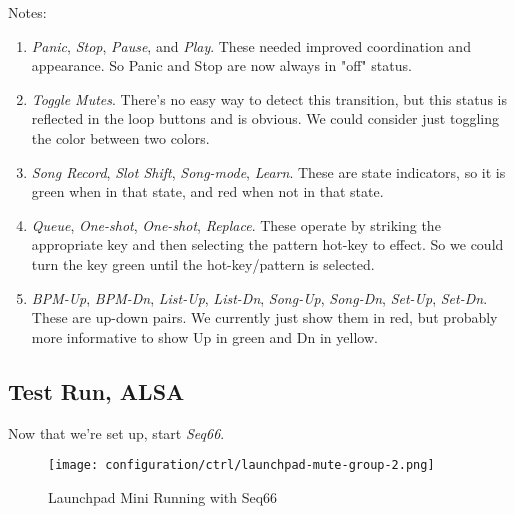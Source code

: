    Notes:

   \begin{enumerate}

      \item \textsl{Panic}, \textsl{Stop}, \textsl{Pause}, and \textsl{Play}.
         These needed improved coordination and appearance.
         So Panic and Stop are now always in "off" status.

      \item \textsl{Toggle Mutes}.
         There's no easy way to detect this transition, but
         this status is reflected in the loop buttons and is obvious.
         We could consider just toggling the color between two colors.

      \item \textsl{Song Record}, \textsl{Slot Shift}, \textsl{Song-mode},
         \textsl{Learn}.
         These are state indicators, so it is green when in that state,
         and red when not in that state.

      \item \textsl{Queue}, \textsl{One-shot}, \textsl{One-shot},
      \textsl{Replace}. 
         These operate by striking the appropriate key and then selecting
         the pattern hot-key to effect.  So we could turn the key green
         until the hot-key/pattern is selected.

      \item \textsl{BPM-Up}, \textsl{BPM-Dn}, \textsl{List-Up},
      \textsl{List-Dn}, \textsl{Song-Up}, \textsl{Song-Dn}, \textsl{Set-Up},
      \textsl{Set-Dn}.
         These are up-down pairs.
         We currently just show them in red, but probably more informative to
         show Up in green and Dn in yellow.

   \end{enumerate}

\subsection{Test Run, ALSA}
\label{subsubsec:launchpad_mini_test_run_alsa}

   Now that we're set up, start \textsl{Seq66}.

\begin{figure}[H]
   \centering 
   \texttt{[image: configuration/ctrl/launchpad-mute-group-2.png]}
   \caption{Launchpad Mini Running with Seq66}
   \label{fig:launchpad_mute_group_perspective}
\end{figure}

